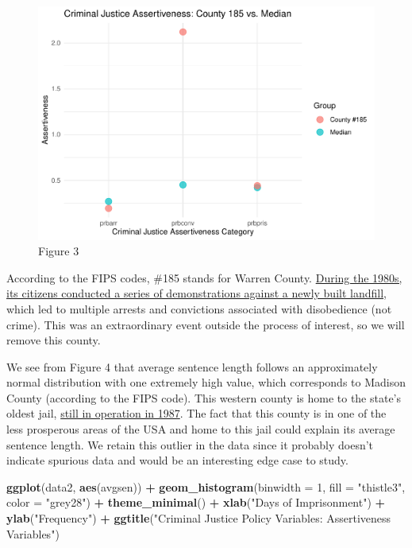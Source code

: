 \documentclass[]{article}
\newenvironment{Shaded}{\begin{snugshade}}{\end{snugshade}}
\newcommand{\DataTypeTok}[1]{\textcolor[rgb]{0.13,0.29,0.53}{#1}}
\newcommand{\DecValTok}[1]{\textcolor[rgb]{0.00,0.00,0.81}{#1}}
\newcommand{\KeywordTok}[1]{\textcolor[rgb]{0.13,0.29,0.53}{\textbf{#1}}}
\newcommand{\NormalTok}[1]{#1}
\newcommand{\OperatorTok}[1]{\textcolor[rgb]{0.81,0.36,0.00}{\textbf{#1}}}
\newcommand{\StringTok}[1]{\textcolor[rgb]{0.31,0.60,0.02}{#1}}
\begin{document}
\begin{figure}

{\centering \includegraphics{lab_3_v7_files/figure-latex/unnamed-chunk-15-1} 

}

\caption{Figure 3}\label{fig:unnamed-chunk-15}
\end{figure}

According to the FIPS codes, \#185 stands for Warren County.
\href{https://en.wikipedia.org/wiki/Warren_County_PCB_Landfill}{During
the 1980s, its citizens conducted a series of demonstrations against a
newly built landfill}, which led to multiple arrests and convictions
associated with disobedience (not crime). This was an extraordinary
event outside the process of interest, so we will remove this county.

We see from Figure 4 that average sentence length follows an
approximately normal distribution with one extremely high value, which
corresponds to Madison County (according to the FIPS code). This western
county is home to the state's oldest jail,
\href{https://mountainx.com/news/murky-future-for-madisons-historic-jailhouse/}{still
in operation in 1987}. The fact that this county is in one of the less
prosperous areas of the USA and home to this jail could explain its
average sentence length. We retain this outlier in the data since it
probably doesn't indicate spurious data and would be an interesting edge
case to study.

\begin{Shaded}
\begin{Highlighting}[]
\KeywordTok{ggplot}\NormalTok{(data2, }\KeywordTok{aes}\NormalTok{(avgsen)) }\OperatorTok{+}
\StringTok{  }\KeywordTok{geom_histogram}\NormalTok{(}\DataTypeTok{binwidth =} \DecValTok{1}\NormalTok{, }\DataTypeTok{fill =} \StringTok{"thistle3"}\NormalTok{, }\DataTypeTok{color =} \StringTok{"grey28"}\NormalTok{) }\OperatorTok{+}
\StringTok{  }\KeywordTok{theme_minimal}\NormalTok{() }\OperatorTok{+}
\StringTok{  }\KeywordTok{xlab}\NormalTok{(}\StringTok{"Days of Imprisonment"}\NormalTok{) }\OperatorTok{+}
\StringTok{  }\KeywordTok{ylab}\NormalTok{(}\StringTok{"Frequency"}\NormalTok{) }\OperatorTok{+}
\StringTok{  }\KeywordTok{ggtitle}\NormalTok{(}\StringTok{"Criminal Justice Policy Variables: Assertiveness Variables"}\NormalTok{)}
\end{Highlighting}
\end{Shaded}
\end{document}
